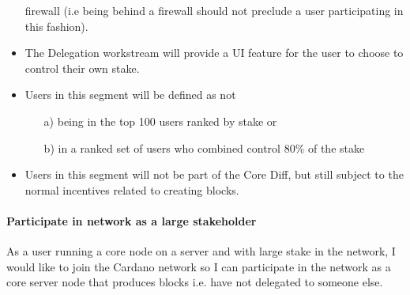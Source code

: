 \documentclass{report}
\theoremstyle{definition}{
  \newtheorem{lemma}{Lemma}[section] %
  \newtheorem{definition}[lemma]{Definition}
}
\theoremstyle{theorem}{
  \newtheorem{invariant}[lemma]{Invariant}
  \newtheorem{proofobligation}[lemma]{Proof Obligation}
}
\numberwithin{equation}{lemma}
\begin{document}
\begin{itemize}
      firewall (i.e being behind a firewall should not preclude a user
      participating in this fashion).
\item The Delegation workstream will provide a UI feature for the user to
      choose to control their own stake.
\item Users in this segment will be defined as {\sc not}
      \begin{itemize}
      \item[a)] being in the top 100 users ranked by stake or
      \item[b)] in a ranked set of users who combined control 80\% of the stake
      \end{itemize}
\item Users in this segment will not be part of the Core Diff, but still
      subject to the normal incentives related to creating blocks.
\end{itemize}


\paragraph{Participate in network as a large stakeholder}

As a user running a core node on a server and with large stake in the network,
I would like to join the Cardano network so I can participate in the network as
a core server node that produces blocks i.e. have not delegated to someone else.
\end{document}
